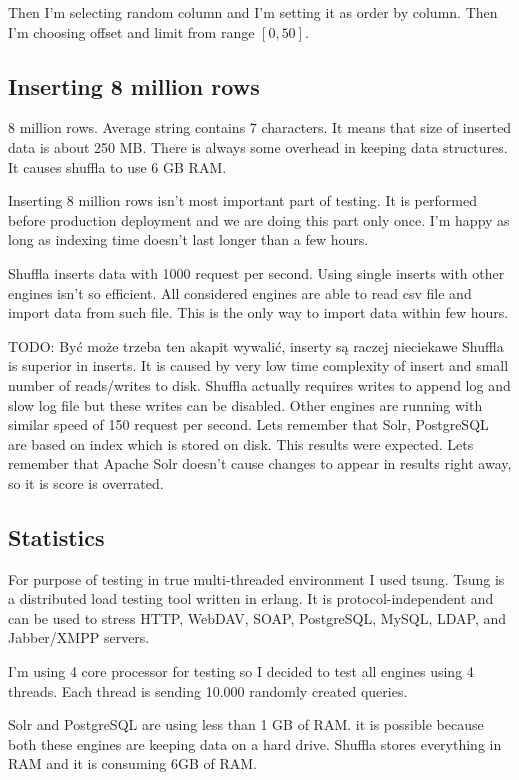 \documentclass[10pt,a4paper]{article}
\newcommand{\todo}[1]{\noindent\colorbox{myRed}{TODO: #1}}
\begin{document}
Then I'm selecting random column and I'm setting it as order by column. Then I'm choosing offset and limit from range $[0, 50]$.

\subsection{Inserting 8 million rows}

8 million rows. Average string contains 7 characters. It means that size of inserted data is about 250 MB. There is always some overhead in keeping data structures. It causes shuffla to use 6 GB RAM.

Inserting 8 million rows isn't most important part of testing. It is performed before production deployment and we are doing this part only once. I'm happy as long as indexing time doesn't last longer than a few hours. 

Shuffla inserts data with 1000 request per second. Using single inserts with other engines isn't so efficient. All considered engines are able to read csv file and import data from such file. This is the only way to import data within few hours.

\todo{Być może trzeba ten akapit wywalić, inserty są raczej nieciekawe}
Shuffla is superior in inserts. It is caused by very low time complexity of insert and small number of reads/writes to disk. Shuffla actually requires writes to append log and slow log file but these writes can be disabled. Other engines are running with similar speed of 150 request per second. Lets remember that Solr, PostgreSQL are based on index which is stored on disk. This results were expected. Lets remember that Apache Solr doesn't cause changes to appear in results right away, so it is score is overrated. 

\subsection{Statistics}

For purpose of testing in true multi-threaded environment I used tsung. Tsung is a distributed load testing tool written in erlang. It is protocol-independent and can be used to stress HTTP, WebDAV, SOAP, PostgreSQL, MySQL, LDAP, and Jabber/XMPP servers. 

I'm using 4 core processor for testing so I decided to test all engines using 4 threads. Each thread is sending 10.000 randomly created queries. 

Solr and PostgreSQL are using less than 1 GB of RAM. it is possible because both these engines are keeping data on a hard drive. Shuffla stores everything in RAM and it is consuming 6GB of RAM. 
\end{document}
